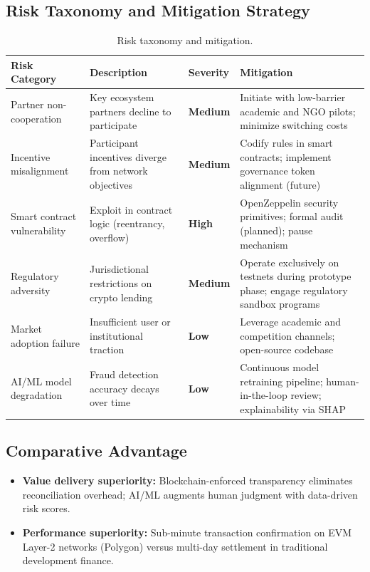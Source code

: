 \documentclass[11pt,a4paper]{article}
\newcommand{\tableheadfont}{\bfseries\small\color{PrimaryBlue}}
\newenvironment{moderntable}[1][H]{%
    \begin{table}[#1]\centering\small%
    \renewcommand{\arraystretch}{1.35}%
}{%
    \end{table}%
}
\begin{document}
\subsection{Risk Taxonomy and Mitigation Strategy}

\begin{moderntable}
\caption{Risk taxonomy and mitigation.}
\begin{tabular}{@{} >{\raggedright}p{2.4cm} >{\raggedright}p{3.2cm} >{\centering\arraybackslash}p{1.8cm} >{\raggedright\arraybackslash}p{4.2cm} @{}}
\toprule
\tableheadfont Risk Category & \tableheadfont Description & \tableheadfont Severity & \tableheadfont Mitigation \\
\midrule
\rowcolor{RowShade}
Partner non-cooperation & Key ecosystem partners decline to participate & {\color{AmberAccent}\textbf{Medium}} & Initiate with low-barrier academic and NGO pilots; minimize switching costs \\
Incentive misalignment & Participant incentives diverge from network objectives & {\color{AmberAccent}\textbf{Medium}} & Codify rules in smart contracts; implement governance token alignment (future) \\
\rowcolor{RowShade}
Smart contract vulnerability & Exploit in contract logic (reentrancy, overflow) & {\color{RedAccent}\textbf{High}} & OpenZeppelin security primitives; formal audit (planned); pause mechanism \\
Regulatory adversity & Jurisdictional restrictions on crypto lending & {\color{AmberAccent}\textbf{Medium}} & Operate exclusively on testnets during prototype phase; engage regulatory sandbox programs \\
\rowcolor{RowShade}
Market adoption failure & Insufficient user or institutional traction & {\color{GreenAccent}\textbf{Low}} & Leverage academic and competition channels; open-source codebase \\
AI/ML model degradation & Fraud detection accuracy decays over time & {\color{GreenAccent}\textbf{Low}} & Continuous model retraining pipeline; human-in-the-loop review; explainability via SHAP \\
\bottomrule
\end{tabular}
\end{moderntable}

\subsection{Comparative Advantage}

\begin{itemize}[noitemsep]
\item \textbf{Value delivery superiority:} Blockchain-enforced transparency eliminates reconciliation overhead; AI/ML augments human judgment with data-driven risk scores.
\item \textbf{Performance superiority:} Sub-minute transaction confirmation on EVM Layer-2 networks (Polygon) versus multi-day settlement in traditional development finance.
\end{itemize}
\end{document}

